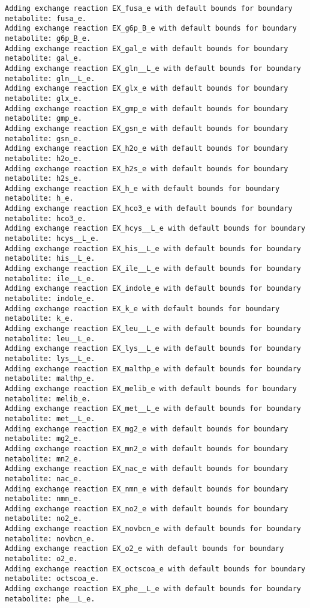 \documentclass[
  letterpaper,
  DIV=11,
  numbers=noendperiod]{scrartcl}
\begin{document}
\begin{verbatim}
Adding exchange reaction EX_fusa_e with default bounds for boundary metabolite: fusa_e.
Adding exchange reaction EX_g6p_B_e with default bounds for boundary metabolite: g6p_B_e.
Adding exchange reaction EX_gal_e with default bounds for boundary metabolite: gal_e.
Adding exchange reaction EX_gln__L_e with default bounds for boundary metabolite: gln__L_e.
Adding exchange reaction EX_glx_e with default bounds for boundary metabolite: glx_e.
Adding exchange reaction EX_gmp_e with default bounds for boundary metabolite: gmp_e.
Adding exchange reaction EX_gsn_e with default bounds for boundary metabolite: gsn_e.
Adding exchange reaction EX_h2o_e with default bounds for boundary metabolite: h2o_e.
Adding exchange reaction EX_h2s_e with default bounds for boundary metabolite: h2s_e.
Adding exchange reaction EX_h_e with default bounds for boundary metabolite: h_e.
Adding exchange reaction EX_hco3_e with default bounds for boundary metabolite: hco3_e.
Adding exchange reaction EX_hcys__L_e with default bounds for boundary metabolite: hcys__L_e.
Adding exchange reaction EX_his__L_e with default bounds for boundary metabolite: his__L_e.
Adding exchange reaction EX_ile__L_e with default bounds for boundary metabolite: ile__L_e.
Adding exchange reaction EX_indole_e with default bounds for boundary metabolite: indole_e.
Adding exchange reaction EX_k_e with default bounds for boundary metabolite: k_e.
Adding exchange reaction EX_leu__L_e with default bounds for boundary metabolite: leu__L_e.
Adding exchange reaction EX_lys__L_e with default bounds for boundary metabolite: lys__L_e.
Adding exchange reaction EX_malthp_e with default bounds for boundary metabolite: malthp_e.
Adding exchange reaction EX_melib_e with default bounds for boundary metabolite: melib_e.
Adding exchange reaction EX_met__L_e with default bounds for boundary metabolite: met__L_e.
Adding exchange reaction EX_mg2_e with default bounds for boundary metabolite: mg2_e.
Adding exchange reaction EX_mn2_e with default bounds for boundary metabolite: mn2_e.
Adding exchange reaction EX_nac_e with default bounds for boundary metabolite: nac_e.
Adding exchange reaction EX_nmn_e with default bounds for boundary metabolite: nmn_e.
Adding exchange reaction EX_no2_e with default bounds for boundary metabolite: no2_e.
Adding exchange reaction EX_novbcn_e with default bounds for boundary metabolite: novbcn_e.
Adding exchange reaction EX_o2_e with default bounds for boundary metabolite: o2_e.
Adding exchange reaction EX_octscoa_e with default bounds for boundary metabolite: octscoa_e.
Adding exchange reaction EX_phe__L_e with default bounds for boundary metabolite: phe__L_e.

\end{verbatim}
\end{document}

